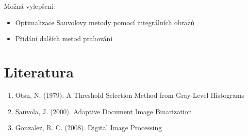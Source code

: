 \documentclass[12pt,a4paper]{article}
\begin{document}
Možná vylepšení:
\begin{itemize}
\item Optimalizace Sauvolovy metody pomocí integrálních obrazů
\item Přidání dalších metod prahování
\end{itemize}

\section*{Literatura}
\begin{enumerate}
\item Otsu, N. (1979). A Threshold Selection Method from Gray-Level Histograms
\item Sauvola, J. (2000). Adaptive Document Image Binarization
\item Gonzalez, R. C. (2008). Digital Image Processing
\end{enumerate}
\end{document}
